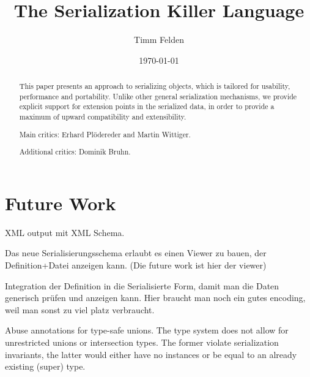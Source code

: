 \documentclass[a4paper,10pt]{article}
\title{The Serialization Killer Language}
\author{Timm Felden}
\date{\today}
\begin{document}
\maketitle

\begin{abstract}
  This paper presents an approach to serializing objects, which is tailored for usability, performance and portability. Unlike other general serialization mechanisms, we provide explicit support for extension points in the serialized data, in order to provide a maximum of upward compatibility and extensibility.
\end{abstract}

\renewcommand{\abstractname}{Acknowledgements}
\begin{abstract}
Main critics: Erhard Plödereder and Martin Wittiger.

Additional critics: Dominik Bruhn.
\end{abstract}



\tableofcontents









\section{Future Work}

XML output mit XML Schema.

Das neue Serialisierungsschema erlaubt es einen Viewer zu bauen, der Definition+Datei anzeigen kann. (Die future work ist hier der viewer)

Integration der Definition in die Serialisierte Form, damit man die Daten generisch prüfen und anzeigen kann. Hier braucht man noch ein gutes encoding, weil man sonst zu viel platz verbraucht.

Abuse annotations for type-safe unions. The type system does not allow for unrestricted unions or intersection types. The former violate serialization invariants, the latter would either have no instances or be equal to an already existing (super) type.
\end{document}
